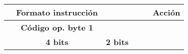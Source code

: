 \documentclass[12pt,twoside]{templates/unerthesis}
\begin{document}
\begin{longtable}[]{@{}lccccl@{}}
\toprule
\begin{minipage}[b]{0.14\columnwidth}\raggedright
\strut
\end{minipage} & \begin{minipage}[b]{0.14\columnwidth}\centering
Formato instrucción\strut
\end{minipage} & \begin{minipage}[b]{0.14\columnwidth}\centering
\strut
\end{minipage} & \begin{minipage}[b]{0.14\columnwidth}\centering
\strut
\end{minipage} & \begin{minipage}[b]{0.14\columnwidth}\centering
\strut
\end{minipage} & \begin{minipage}[b]{0.14\columnwidth}\raggedright
Acción\strut
\end{minipage}\tabularnewline
\midrule
\endhead
\begin{minipage}[t]{0.14\columnwidth}\raggedright
\strut
\end{minipage} & \begin{minipage}[t]{0.14\columnwidth}\centering
\textbf{Código op. byte 1}\strut
\end{minipage} & \begin{minipage}[t]{0.14\columnwidth}\centering
\strut
\end{minipage} & \begin{minipage}[t]{0.14\columnwidth}\centering
\strut
\end{minipage} & \begin{minipage}[t]{0.14\columnwidth}\centering
\strut
\end{minipage} & \begin{minipage}[t]{0.14\columnwidth}\raggedright
\strut
\end{minipage}\tabularnewline
\begin{minipage}[t]{0.14\columnwidth}\raggedright
\strut
\end{minipage} & \begin{minipage}[t]{0.14\columnwidth}\centering
\textbf{4 bits}\strut
\end{minipage} & \begin{minipage}[t]{0.14\columnwidth}\centering
\textbf{2 bits}\strut
\end{minipage} & \begin{minipage}[t]{0.14\columnwidth}\centering
\strut
\end{minipage} & \begin{minipage}[t]{0.14\columnwidth}\centering

\end{minipage}
\end{longtable}
\end{document}

